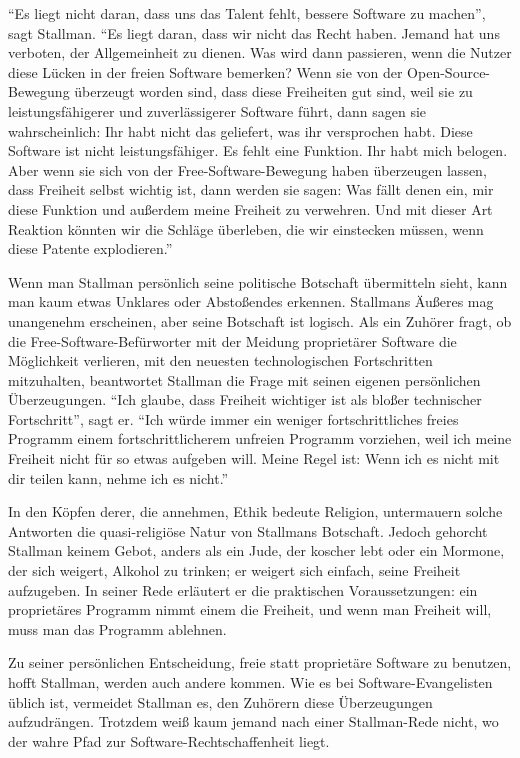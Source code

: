 "`Es liegt nicht daran, dass uns das Talent fehlt, bessere Software zu machen"', sagt Stallman. "`Es liegt daran, dass wir nicht das Recht haben. Jemand hat uns verboten, der Allgemeinheit zu dienen. Was wird dann passieren, wenn die Nutzer diese Lücken in der freien Software bemerken? Wenn sie von der Open-Source-Bewegung überzeugt worden sind, dass diese Freiheiten gut sind, weil sie zu leistungsfähigerer und zuverlässigerer Software führt, dann sagen sie wahrscheinlich: \glq Ihr habt nicht das geliefert, was ihr versprochen habt. Diese Software ist nicht leistungsfähiger. Es fehlt eine Funktion. Ihr habt mich belogen.\grq{} Aber wenn sie sich von der Free-Software-Bewegung haben überzeugen lassen, dass Freiheit selbst wichtig ist, dann werden sie sagen: \glq Was fällt denen ein, mir diese Funktion und außerdem meine Freiheit zu verwehren.\grq{} Und mit dieser Art Reaktion könnten wir die Schläge überleben, die wir einstecken müssen, wenn diese Patente explodieren."'

Wenn man Stallman persönlich seine politische Botschaft übermitteln sieht, kann man kaum etwas Unklares oder Abstoßendes erkennen. Stallmans Äußeres mag unangenehm erscheinen, aber seine Botschaft ist logisch. Als ein Zuhörer fragt, ob die Free-Software-Befürworter mit der Meidung proprietärer Software die Möglichkeit verlieren, mit den neuesten technologischen Fortschritten mitzuhalten, beantwortet Stallman die Frage mit seinen eigenen persönlichen Überzeugungen. "`Ich glaube, dass Freiheit wichtiger ist als bloßer technischer Fortschritt"', sagt er. "`Ich würde immer ein weniger fortschrittliches freies Programm einem fortschrittlicherem unfreien Programm vorziehen, weil ich meine Freiheit nicht für so etwas aufgeben will. Meine Regel ist: Wenn ich es nicht mit dir teilen kann, nehme ich es nicht."'

In den Köpfen derer, die annehmen, Ethik bedeute Religion, untermauern solche Antworten die quasi-religiöse Natur von Stallmans Botschaft. Jedoch gehorcht Stallman keinem Gebot, anders als ein Jude, der koscher lebt oder ein Mormone, der sich weigert, Alkohol zu trinken; er weigert sich einfach, seine Freiheit aufzugeben. In seiner Rede erläutert er die praktischen Voraussetzungen: ein proprietäres Programm nimmt einem die Freiheit, und wenn man Freiheit will, muss man das Programm ablehnen.

Zu seiner persönlichen Entscheidung, freie statt proprietäre Software zu benutzen, hofft Stallman, werden auch andere kommen. Wie es bei Software-Evangelisten üblich ist, vermeidet Stallman es, den Zuhörern diese Überzeugungen aufzudrängen. Trotzdem weiß kaum jemand nach einer Stallman-Rede nicht, wo der wahre Pfad zur Software-Rechtschaffenheit liegt.

